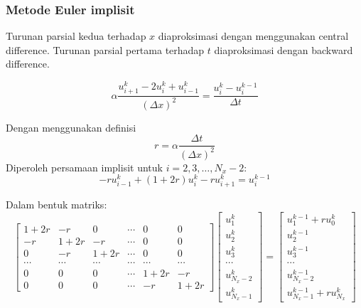\documentclass[9pt]{beamer}
\begin{document}
\begin{frame}
\frametitle{Metode Euler implisit}

Turunan parsial kedua terhadap $x$ diaproksimasi dengan menggunakan central difference.
Turunan parsial pertama terhadap $t$ diaproksimasi dengan backward difference.

\begin{equation}
\alpha \frac{u^{k}_{i+1} - 2u^{k}_{i} + u^{k}_{i-1}}{(\Delta x)^2} = \frac{u^{k}_{i} - u^{k-1}_{i}}{\Delta t}
\end{equation}

Dengan menggunakan definisi
\begin{equation}
r = \alpha \frac{\Delta t}{(\Delta x)^2}
\end{equation}
Diperoleh persamaan implisit untuk $i = 2, 3, \ldots, N_{x}-2$:
\begin{equation}
-ru^{k}_{i-1}+ (1 + 2r)u^{k}_{i} - ru^{k}_{i+1} = u^{k-1}_{i}
\end{equation}

Dalam bentuk matriks:
\begin{equation}
\begin{bmatrix}
1 + 2r & -r & 0 & \cdots & 0 & 0 \\
-r & 1 + 2r & -r & \cdots & 0 & 0 \\
0 & -r & 1 + 2r & \cdots & 0 & 0 \\
\cdots & \cdots & \cdots & \cdots & \cdots & \cdots \\
0 & 0 & 0 & \cdots & 1 + 2r & -r \\
0 & 0 & 0 & \cdots & -r & 1 + 2r
\end{bmatrix}
\begin{bmatrix}
u^{k}_{1} \\
u^{k}_{2} \\
u^{k}_{3} \\
\cdots \\
u^{k}_{N_{x}-2} \\
u^{k}_{N_{x}-1}
\end{bmatrix} =
\begin{bmatrix}
u^{k-1}_{1} + ru^{k}_{0} \\
u^{k-1}_{2} \\
u^{k-1}_{3} \\
\cdots \\
u^{k-1}_{N_{x}-2} \\
u^{k-1}_{N_{x}-1} + ru^{k}_{N_{x}}
\end{bmatrix}
\end{equation}

\end{frame}
\end{document}
